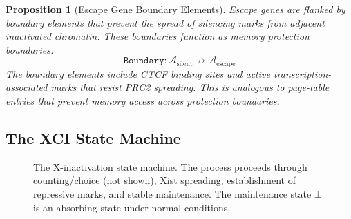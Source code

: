 \documentclass[12pt,a4paper]{article}
\newtheorem{proposition}[theorem]{Proposition}
\begin{document}
\begin{proposition}[Escape Gene Boundary Elements]
\label{prop:escape-boundary}
Escape genes are flanked by boundary elements that prevent the spread of silencing marks from adjacent inactivated chromatin. These boundaries function as \emph{memory protection boundaries}:
\[
    \texttt{Boundary} : \mathcal{A}_{\mathrm{silent}} \not\to \mathcal{A}_{\mathrm{escape}}
\]
The boundary elements include CTCF binding sites and active transcription-associated marks that resist PRC2 spreading. This is analogous to page-table entries that prevent memory access across protection boundaries.
\end{proposition}

\subsection{The XCI State Machine}

\begin{figure}[H]
\centering
{}
\caption{The X-inactivation state machine. The process proceeds through counting/choice (not shown), Xist spreading, establishment of repressive marks, and stable maintenance. The maintenance state $\bot$ is an absorbing state under normal conditions.}
\label{fig:xci-sm}
\end{figure}

\end{document}
